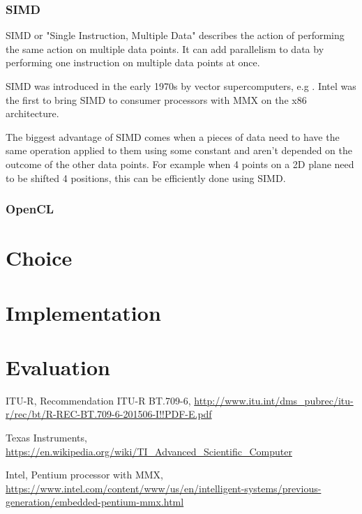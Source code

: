 \documentclass[a4paper]{article}
\begin{document}
\subsubsection{SIMD}
SIMD or "Single Instruction, Multiple Data" describes the action of performing the same action on multiple data points. It can add parallelism to data by performing one instruction on multiple data points at once.

SIMD was introduced in the early 1970s by vector supercomputers, e.g \cite{TI-ASC}.
Intel was the first to bring SIMD to consumer processors with MMX\cite{INTEL-MMX} on the x86 architecture.

The biggest advantage of SIMD comes when a pieces of data need to have the same operation applied to them using some constant and aren't depended on the outcome of the other data points. For example when 4 points on a 2D plane need to be shifted 4 positions, this can be efficiently done using SIMD.

\subsubsection{OpenCL}

\section{Choice}

\section{Implementation}

\section{Evaluation}

\begin{thebibliography}{9}

	ITU-R,
	Recommendation  ITU-R  BT.709-6,	
	\url{http://www.itu.int/dms_pubrec/itu-r/rec/bt/R-REC-BT.709-6-201506-I!!PDF-E.pdf}
  
	Texas Instruments,
	\url{https://en.wikipedia.org/wiki/TI_Advanced_Scientific_Computer}
 
Intel,
Pentium processor with MMX,
\url{https://www.intel.com/content/www/us/en/intelligent-systems/previous-generation/embedded-pentium-mmx.html}

\end{thebibliography}
\end{document}
